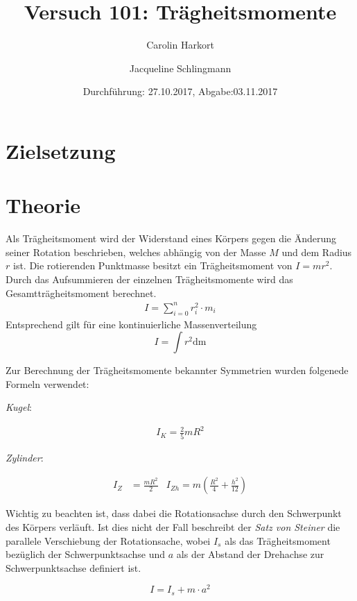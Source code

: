 \documentclass[
  bibliography=totoc,     %
  captions=tableheading,  %
  titlepage=firstiscover, %
]{scrartcl}
\title{Versuch 101: Trägheitsmomente}
\author{Carolin Harkort \and Jacqueline Schlingmann}
\date{Durchführung: 27.10.2017, Abgabe:03.11.2017}
\begin{document}


\section{Zielsetzung}
\section{Theorie}

Als Trägheitsmoment wird der Widerstand eines Körpers gegen die Änderung seiner Rotation beschrieben,
welches abhängig von der Masse $M$ und dem Radius $r$ ist.
Die rotierenden Punktmasse besitzt ein Trägheitsmoment von $I = mr^2$.
Durch das Aufsummieren der einzelnen Trägheitsmomente wird das Gesamtträgheitsmoment berechnet.
\begin{align}
 I= \sum_{i = 0}^n r_i^2\cdot m_i
 \end{align}
 Entsprechend gilt für eine kontinuierliche Massenverteilung
 \begin{equation}
   \label{eqn:Trägheitsmoment}
   I = \int r^2\mathup{dm}
 \end{equation}

Zur Berechnung der Trägheitsmomente bekannter Symmetrien wurden folgenede Formeln verwendet:

\emph{Kugel}:

\begin{align}
  I_K = \frac{2}{5}mR^2
  \label{eqn:3}
\end{align}

\emph{Zylinder}:

\begin{align}
I_{Z} &= \frac{mR^2}{2} &
   I_{Zh} = m(\frac{R^2}{4} + \frac{h^2}{12})
   \label{eqn:4}
\end{align}

Wichtig zu beachten ist, dass dabei die Rotationsachse durch den Schwerpunkt des Körpers verläuft.
Ist dies nicht der Fall beschreibt der \textit{Satz von Steiner} die parallele Verschiebung
der Rotationsache, wobei $I_s$ als das Trägheitsmoment bezüglich der Schwerpunktsachse
und $a$ als der Abstand der Drehachse zur Schwerpunktsachse definiert ist.

\begin{equation}
  \label{eqn:Steiner}
  I = I_s +m\cdot a^2
\end{equation}
\end{document}
